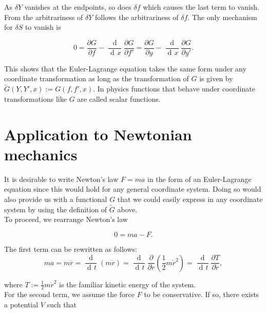 \documentclass{article}
\DeclareMathOperator{\dd}{d\!}
\DeclareMathOperator{\ddd}{\mathrm{d}}
\begin{document}
As $\delta Y$ vanishes at the endpoints, so does $\delta f$ which causes the last term to vanish. From the arbitrariness of $\delta Y$ follows the arbitrariness of $\delta f$. The only mechanism for $\delta S$ to vanish is

\begin{equation}
0 = \frac{\partial G}{\partial f} - \frac{\ddd}{\dd x} \frac{\partial G}{\partial f'}
= \frac{\partial G}{\partial y} - \frac{\ddd}{\dd x} \frac{\partial G}{\partial y'}.
\end{equation}

This shows that the Euler-Lagrange equation takes the same form under any coordinate transformation as long as the transformation of $G$ is given by $\widetilde{G}(Y,Y',x) := G(f,f',x)$. In physics functions that behave under coordinate transformations like $G$ are called scalar functions.

\section{Application to Newtonian mechanics \cite{Guthrie}} %


It is desirable to write Newton's law $F=ma$ in the form of an Euler-Lagrange equation since this would hold for any general coordinate system. Doing so would also provide us with a functional $G$ that we could easily express in any coordinate system by using the definition of $\widetilde{G}$ above.\\

To proceed, we rearrange Newton's law

\begin{equation}
0 = ma - F. 
\end{equation}

The first term can be rewritten as follows:
\begin{equation}
ma = m \ddot{r} = \frac{\ddd}{\dd t} (m \dot{r})
= \frac{\ddd}{\dd t} \frac{\partial}{\partial \dot{r}} \left(\frac{1}{2} m \dot{r}^2 \right)
= \frac{\ddd}{\dd t} \frac{\partial T}{\partial \dot{r}},
\end{equation}

where $T:=\frac{1}{2} m \dot{r}^2$ is the familiar kinetic energy of the system. \\

For the second term, we assume the force $F$ to be conservative. If so, there exists a potential $V$ such that
\end{document}
